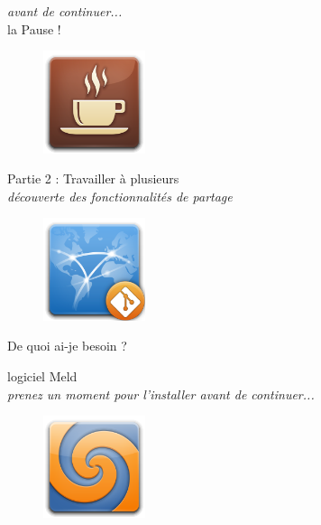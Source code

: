 \documentclass{beamer}
\begin{document}
\begin{frame}
	\begin{center}
		{\small  \textit{avant de continuer...}}\\
 		\Large{la Pause !} 		
	\end{center}

	\begin{figure}
		\centering
		\includegraphics[height=3cm]{img/cafe}
	\end{figure}
\end{frame}


\begin{frame}
	\begin{center}
 		\Large{Partie 2 : Travailler à plusieurs}\\
 		{\small  \textit{découverte des fonctionnalités de partage}}
	\end{center}

	\begin{figure}
		\centering
		\includegraphics[height=3cm]{img/web}
	\end{figure}
\end{frame}

\begin{frame}{De quoi ai-je besoin ?}
	\begin{center}
 		\Large{logiciel Meld}\\
 		{\small  \textit{prenez un moment pour l'installer avant de continuer...}}
	\end{center}

	\begin{figure}
		\centering
		\includegraphics[height=3cm]{img/meld}
	\end{figure}
\end{frame}
\end{document}
